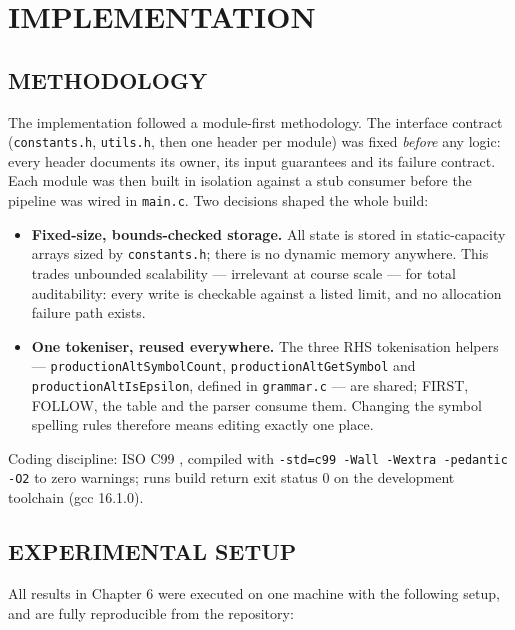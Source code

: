 \documentclass[12pt,a4paper,oneside,openany]{report}
\newcommand{\code}[1]{\texttt{#1}}
\begin{document}

\chapter{IMPLEMENTATION}

\section{METHODOLOGY}
The implementation followed a module-first methodology. The interface
contract (\code{constants.h}, \code{utils.h}, then one header per module)
was fixed \emph{before} any logic: every header documents its owner, its
input guarantees and its failure contract. Each module was then built in
isolation against a stub consumer before the pipeline was wired in
\code{main.c}. Two decisions shaped the whole build:

\begin{itemize}
  \item \textbf{Fixed-size, bounds-checked storage.} All state is stored
        in static-capacity arrays sized by \code{constants.h}; there is no
        dynamic memory anywhere. This trades unbounded scalability ---
        irrelevant at course scale --- for total auditability: every write
        is checkable against a listed limit, and no allocation failure
        path exists.
  \item \textbf{One tokeniser, reused everywhere.} The three RHS
        tokenisation helpers --- \code{productionAltSymbolCount},
        \code{productionAltGetSymbol} and \code{productionAltIsEpsilon},
        defined in \code{grammar.c} --- are shared; FIRST, FOLLOW, the
        table and the parser consume them. Changing the symbol spelling
        rules therefore means editing exactly one place.
\end{itemize}

Coding discipline: ISO C99 \cite{isoC99}, compiled with
\texttt{-std=c99 -Wall -Wextra -pedantic -O2} to zero warnings; runs build
return exit status 0 on the development toolchain (gcc 16.1.0).

\section{EXPERIMENTAL SETUP}
All results in Chapter 6 were executed on one machine with the following
setup, and are fully reproducible from the repository:
\end{document}
